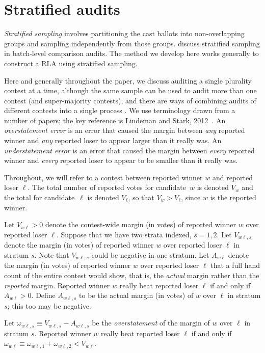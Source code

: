 \documentclass[runningheads]{llncs}
\begin{document}
\section{Stratified audits} \label{sec:stratified}

\emph{Stratified sampling} involves partitioning the cast ballots
into non-overlapping groups and sampling independently from those groups.
\cite{stark08a,higginsEtal11} discuss stratified sampling in batch-level comparison audits.
The method we develop here works generally to construct a RLA using stratified sampling.

Here and generally throughout the paper, we 
discuss auditing a single plurality contest at a time, although the same sample can be used to audit
more than one contest (and super-majority contests), and there are ways of combining audits of different contests into
a single process \cite{stark09c,stark10d}.
We use terminology drawn from a number of papers; the key reference is Lindeman and Stark, 2012~\cite{lindemanStark12}.
An \emph{overstatement error} is an error that caused the margin between \emph{any} reported
winner and \emph{any} reported loser to appear larger than it really was.
An \emph{understatement error} is an error that caused the margin between \emph{every} reported
winner and \emph{every} reported loser to appear to be smaller than it really was.

Throughout, we will refer to a contest between reported winner $w$ and reported loser $\ell$.
The total number of reported votes for candidate~$w$ is denoted $V_w$ 
and the total for candidate~$\ell$ is denoted $V_\ell$, so that $V_w > V_\ell$, since 
$w$ is the reported winner.

Let $V_{w\ell} > 0$ denote the contest-wide margin (in votes) of reported winner 
$w$ over reported loser $\ell$.
Suppose that we have two strata indexed, $s=1, 2.$
Let $V_{w\ell,s}$ denote the margin (in votes) of reported winner $w$ over reported loser $\ell$
in stratum $s$. 
Note that $V_{w\ell,s}$ could be negative in one stratum.
Let $A_{w\ell}$ denote the margin (in votes)
of reported winner $w$ over reported loser $\ell$ that 
a full hand count of the entire contest would show, that is, the \emph{actual} margin rather
than the \emph{reported} margin.
Reported winner $w$ really beat reported loser $\ell$ if and only if $A_{w\ell} > 0$.
Define $A_{w\ell,s}$ to be the actual margin (in votes) of $w$ over $\ell$ in stratum $s$;
this too may be negative.

Let $\omega_{w\ell,s} \equiv V_{w\ell,s} - A_{w\ell,s}$ be the \emph{overstatement}
of the margin of $w$ over $\ell$ in stratum $s$.
Reported winner $w$ really beat reported loser 
$\ell$ if and only if $\omega_{w\ell} \equiv \omega_{w\ell,1} + \omega_{w\ell,2} < V_{w\ell}$.
\end{document}
